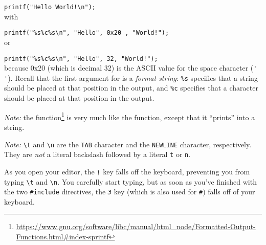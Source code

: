 \lstinline{printf("Hello World!\n");} \\
with

\lstinline{printf("%s%c%s\n", "Hello", 0x20 , "World!");} \\
or

\lstinline{printf("%s%c%s\n", "Hello", 32, "World!");} \\
because 0x20 (which is decimal 32) is the ASCII value for the space character (\lstinline{' '}).
Recall that the first argument for  is a \textit{format string}: \texttt{\%s} specifies that a string should be placed at that position in the output, and \texttt{\%c} specifies that a character should be placed at that position in the output.

\textit{Note: } the  function\footnote{\url{https://www.gnu.org/software/libc/manual/html_node/Formatted-Output-Functions.html\#index-sprintf}} is very much like the  function, except that it ``prints'' into a string.

\textit{Note: } \lstinline{\t} and \lstinline{\n} are the \texttt{TAB} character and the \texttt{NEWLINE} character, respectively.
They are \textit{not} a literal backslash followed by a literal \lstinline{t} or \lstinline{n}.

As you open your editor, the \textit{\texttt{\textbackslash}} key falls off the keyboard, preventing you from typing \texttt{\textbackslash t} and \texttt{\textbackslash n}.
You carefully start typing, but as soon as you've finished with the two \lstinline{#include} directives, the \textit{\texttt{3}} key (which is also used for \textit{\texttt{\#}}) falls off of your keyboard.

\begin{description}
\end{description}

